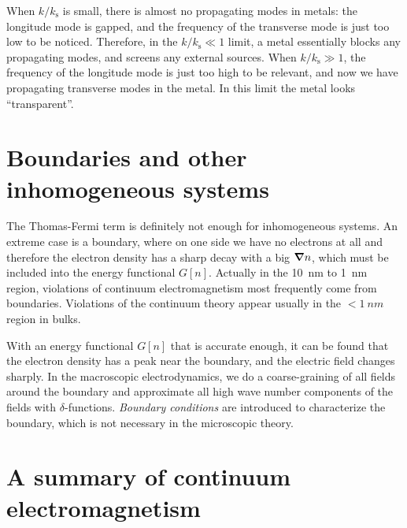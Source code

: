 \documentclass[hyperref, a4paper]{article}
\begin{document}
When $k / k_\text{s}$ is small, there is almost no propagating modes in metals: the longitude mode is gapped, and the frequency of the transverse mode is just too low to be noticed.
Therefore, in the $k / k_\text{s} \ll 1$ limit, a metal essentially blocks any propagating modes, and screens any external sources.
When $k / k_\text{s} \gg 1$, the frequency of the longitude mode is just too high to be relevant, and now we have propagating transverse modes in the metal.
In this limit the metal looks ``transparent''.

\section{Boundaries and other inhomogeneous systems}

The Thomas-Fermi term is definitely not enough for inhomogeneous systems.
An extreme case is a boundary, where on one side we have no electrons at all and therefore the electron density has a sharp decay with a big $\grad{n}$, which must be included into the energy functional $G[n]$.
Actually in the \SI{10}{nm} to \SI{1}{nm} region, violations of continuum electromagnetism most frequently come from boundaries.
Violations of the continuum theory appear usually in the $< \SI{1}{nm}$ region in bulks.

With an energy functional $G[n]$ that is accurate enough, it can be found that the electron density has a peak near the boundary, and the electric field changes sharply.
In the macroscopic electrodynamics, we do a coarse-graining of all fields around the boundary and approximate all high wave number components of the fields with $\delta$-functions. 
\emph{Boundary conditions} are introduced to characterize the boundary, which is not necessary in the microscopic theory.

\section{A summary of continuum electromagnetism}
\end{document}
